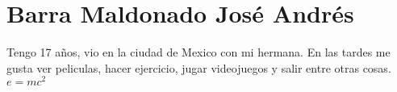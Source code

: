 \chapter{Barra Maldonado José Andrés}
Tengo 17 años, vio en la ciudad de Mexico con mi hermana. En las tardes me gusta ver peliculas, hacer ejercicio, jugar videojuegos y salir entre otras cosas.
$e=mc^2$

